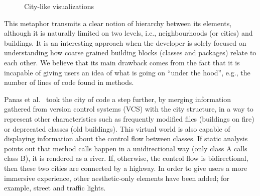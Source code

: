 \begin{figure}
    \centering
    \caption{City-like visualizations}
\end{figure}


This metaphor transmits a clear notion of hierarchy between its elements,
although it is naturally limited on two levels, i.e., neighbourhoods (or cities)
and buildings. It is an interesting approach when the developer is solely
focused on understanding how coarse grained building blocks (classes and packages)
relate to each other. We believe that its main drawback comes from the fact that
it is incapable of giving users an idea of what is going on ``under the hood'',
e.g., the number of lines of code found in methods.

Panas et al.~\cite{panas20033d} took the city of code a step further, by merging
information gathered from version control systems (VCS) with the city structure,
in a way to represent other characteristics such as frequently modified files
(buildings on fire) or deprecated classes (old buildings). This virtual world is
also capable of displaying information about the control flow between classes.
If static analysis points out that method calls happen in a unidirectional way
(only class A calls class B), it is rendered as a river. If, otherwise, the
control flow is bidirectional, then these two cities are connected by a highway.
In order to give users a more immersive experience, other aesthetic-only
elements have been added; for example, street and traffic lights.

